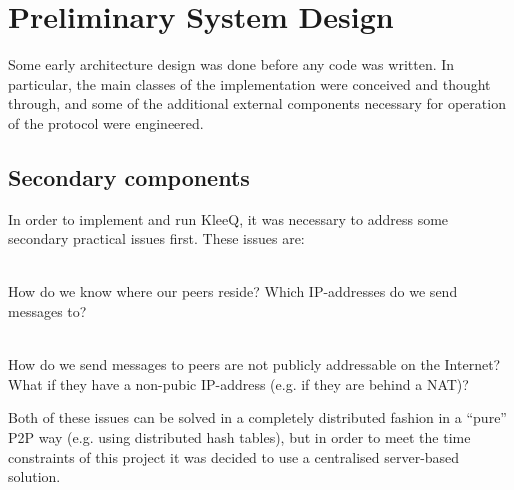 \documentclass[a4paper, 12pt]{report}
\begin{document}
\section{Preliminary System Design}
\label{sec:prep.design}
Some early architecture design was done before any code was written. In particular, the main classes of the implementation were conceived and thought through, and some of the additional external components necessary for operation of the protocol were engineered.
\subsection{Secondary components}
In order to implement and run KleeQ, it was necessary to address some secondary practical issues first. These issues are:
\begin{description}[labelindent=0.5cm, leftmargin=1.3cm, rightmargin=0.5cm]
    \item[Contact Discovery] \hfill \\
        How do we know where our peers reside? Which IP-addresses do we send messages to?
    \item[Transport] \hfill \\
        How do we send messages to peers are not publicly addressable on the Internet? What if they have a non-pubic IP-address (e.g. if they are behind a NAT)?
\end{description}

Both of these issues can be solved in a completely distributed fashion in a ``pure'' P2P way (e.g. using distributed hash tables), but in order to meet the time constraints of this project it was decided to use a centralised server-based solution. \\
\end{document}

